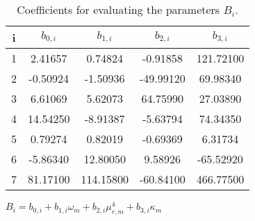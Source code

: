 \begin{table}
    \centering
    \caption{Coefficients for evaluating the parameters $B_i$.}\label{Bi_table}
    \begin{threeparttable} 
\begin{tabular*}{0.8\textwidth}{c|cccc}
    \toprule
    i     & $b_{0,i}$        & $b_{1,i}$         & $b_{2,i}$       & $b_{3,i}$   \\
    \midrule
    1     & 2.41657          & 0.74824           & -0.91858        & 121.72100   \\
    2     & -0.50924         & -1.50936          & -49.99120       & 69.98340    \\
    3     & 6.61069          & 5.62073           & 64.75990        & 27.03890    \\
    4     & 14.54250         & -8.91387          & -5.63794        & 74.34350    \\
    5     & 0.79274          & 0.82019           & -0.69369        & 6.31734     \\
    6     & -5.86340         & 12.80050          & 9.58926         & -65.52920   \\
    7     & 81.17100         & 114.15800         & -60.84100       & 466.77500   \\
    \bottomrule
\end{tabular*}
\begin{tablenotes}
    \footnotesize    
    \item $B_{i} = b_{0,i} + b_{1,i}\omega_m + b_{2,i} \mu_{r,m}^4 + b_{3,i} \kappa_m$\\
  \end{tablenotes}
\end{threeparttable}
\end{table}


